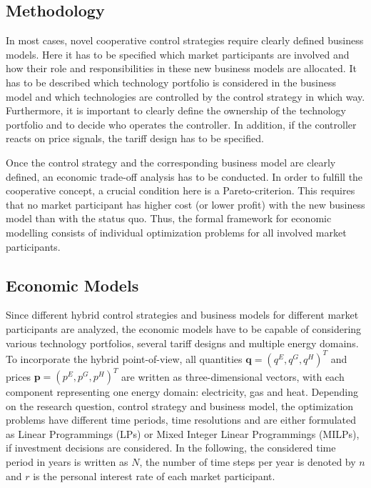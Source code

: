 \documentclass[a4paper,twoside]{article}
\begin{document}
\subsection{Methodology}
\label{sec:econ-2}
In most cases, novel cooperative control strategies require clearly
defined business models. Here it has to be specified which market
participants are involved and how their role and responsibilities in
these new business models are allocated. It has to be described which
technology portfolio is considered in the business model and which
technologies are controlled by the control strategy in which
way. Furthermore, it is important to clearly define the ownership of
the technology portfolio
and to decide who operates the controller. 
In addition,
if the controller reacts on price signals, the tariff design has to be
specified.

Once the control strategy and the corresponding business model are
clearly defined, an economic trade-off analysis 
has to be conducted. In order to fulfill the cooperative
concept, a  crucial condition here is a Pareto-criterion. This
requires that no market participant has higher cost (or lower profit)
with the new business model
than with the status quo. Thus, the formal framework for economic
modelling consists of individual optimization problems for all
involved market participants. 

\subsection{Economic Models}
\label{sec:econ-3}
Since different hybrid control strategies and business models for
different market participants are analyzed, the economic models have
to be capable of considering various technology portfolios, several
tariff designs and multiple energy domains. To incorporate the hybrid
point-of-view, all quantities $\mathbf{q}=(q^E, q^G, q^H )^T$ and prices $\mathbf{p}=(p^E, p^G, p^H )^T$ are written as
three-dimensional vectors,
with each component representing one energy domain: electricity,
gas and heat. Depending on the research question, control strategy and
business model, the optimization problems have different time periods,
time resolutions and are either formulated as Linear Programmings
(LPs) or Mixed Integer Linear Programmings (MILPs), if investment
decisions are considered. In the following, the considered
time period in years is written as $N$, the number of time steps per
year is denoted by $n$ and $r$ is the personal interest rate of each
market participant. 
\end{document}
